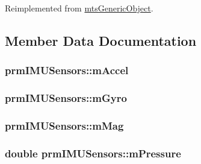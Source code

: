 Reimplemented from \hyperlink{classmts_generic_object_a4916a6c62ee5b167d7c93c88ab72523a}{mts\-Generic\-Object}.



\subsection{Member Data Documentation}
\hypertarget{classprm_i_m_u_sensors_a74d634c113fe2bc5aaaeffd10e351305}{
\subsubsection[{m\-Accel}]{ prm\-I\-M\-U\-Sensors\-::m\-Accel\hspace{0.3cm}{\ttfamily [protected]}}}\label{classprm_i_m_u_sensors_a74d634c113fe2bc5aaaeffd10e351305}
\hypertarget{classprm_i_m_u_sensors_a7a38dc11afb30987fab2d1138f84d287}{
\subsubsection[{m\-Gyro}]{ prm\-I\-M\-U\-Sensors\-::m\-Gyro\hspace{0.3cm}{\ttfamily [protected]}}}\label{classprm_i_m_u_sensors_a7a38dc11afb30987fab2d1138f84d287}
\hypertarget{classprm_i_m_u_sensors_af53252673fffb8b2723b337eb9c344cc}{
\subsubsection[{m\-Mag}]{ prm\-I\-M\-U\-Sensors\-::m\-Mag\hspace{0.3cm}{\ttfamily [protected]}}}\label{classprm_i_m_u_sensors_af53252673fffb8b2723b337eb9c344cc}
\hypertarget{classprm_i_m_u_sensors_abc350c599f43ec1e8ae00e374faa9615}{
\subsubsection[{m\-Pressure}]{\setlength{\rightskip}{0pt plus 5cm}double prm\-I\-M\-U\-Sensors\-::m\-Pressure\hspace{0.3cm}{\ttfamily [protected]}}}\label{classprm_i_m_u_sensors_abc350c599f43ec1e8ae00e374faa9615}
